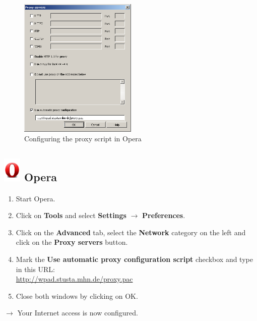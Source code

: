 \documentclass[a4paper,12pt]{scrartcl}
\newcommand{\optemph}[1]{\textbf{#1}}
\begin{document}
\newpage
\begin{figure}
  \begin{center}
    \includegraphics[width=0.5\textwidth,keepaspectratio]{Bilder/Proxy_Opera_EN}
  \end{center}
  \caption{Configuring the proxy script in Opera}
\end{figure}

\subsection*{\includegraphics[height=1.2cm,keepaspectratio]{Bilder/Opera_O} Opera}
\begin{enumerate}
    \item Start Opera.
	\item Click on \optemph{Tools} and select \optemph{Settings} $\rightarrow$ \optemph{Preferences}.
	\item Click on the \optemph{Advanced} tab, select the \optemph{Network} category on the left and click on the \optemph{Proxy servers} button.
	\item Mark the \optemph{Use automatic proxy configuration script} checkbox and type in this URL: \\ \url{http://wpad.stusta.mhn.de/proxy.pac}
    \item Close both windows by clicking on OK.
\end{enumerate}
$\rightarrow$ Your Internet access is now configured.
\end{document}
